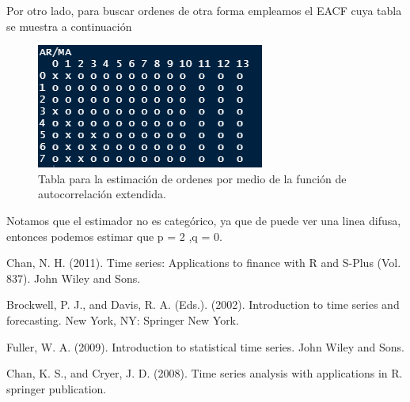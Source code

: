 \documentclass[a4paper, 11pt]{article}
\begin{document}
Por otro lado, para buscar ordenes de otra forma empleamos el EACF cuya tabla se muestra a continuación
\begin{figure}[H] 
    \centering 
    \includegraphics[width = 10 cm ]{Figures/EACF8.png} 
    \caption{Tabla para la estimación de ordenes por medio de la función de autocorrelación extendida.}
    \label{Fig. 8.1}
\end{figure} 
Notamos que el estimador no es categórico, ya que de puede ver una linea difusa, entonces podemos estimar que p = 2 ,q = 0.

\begin{thebibliography}{9}

    Chan, N. H. (2011). Time series: Applications to finance with R and S-Plus (Vol. 837). John Wiley and Sons.
  
    Brockwell, P. J., and Davis, R. A. (Eds.). (2002). Introduction to time series and forecasting. New York, NY: Springer New York.

    Fuller, W. A. (2009). Introduction to statistical time series. John Wiley and Sons.

    Chan, K. S., and Cryer, J. D. (2008). Time series analysis with applications in R. springer publication.
\end{thebibliography}

    
\end{document}
